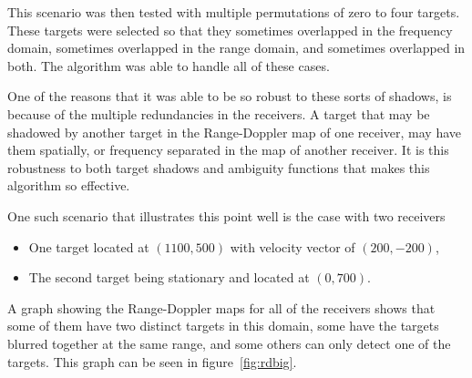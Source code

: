 \documentclass[12pt,openany,a4paper]{book}
\begin{document}
\bigskip

This scenario was then tested with multiple permutations of zero to four targets. These targets were selected so that they sometimes overlapped in the frequency domain, sometimes overlapped in the range domain, and sometimes overlapped in both. The algorithm was able to handle all of these cases.

\bigskip

One of the reasons that it was able to be so robust to these sorts of shadows, is because of the multiple redundancies in the receivers. A target that may be shadowed by another target in the Range-Doppler map of one receiver, may have them spatially, or frequency separated in the map of another receiver. It is this robustness to both target shadows and ambiguity functions that makes this algorithm so effective.

\bigskip

One such scenario that illustrates this point well is the case with two receivers
\begin{itemize}
\item{One target located at $(1100,500)$ with velocity vector of $(200,-200)$,}
\item{The second target being stationary and located at $(0,700)$.}
\end{itemize}

\bigskip

A graph showing the Range-Doppler maps for all of the receivers shows that some of them have two distinct targets in this domain, some have the targets blurred together at the same range, and some others can only detect one of the targets. This graph can be seen in figure~\ref{fig:rdbig}.
\end{document}
